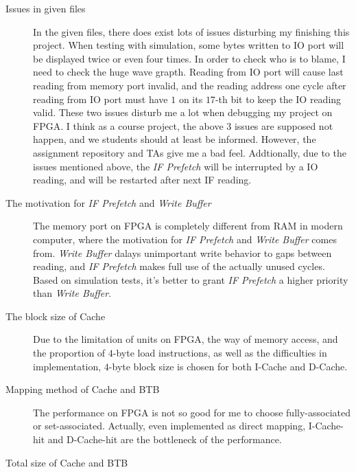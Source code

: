 \documentclass{article}
\begin{document}
        \begin{description}
            \item[Issues in given files]
                In the given files, there does exist lots of issues disturbing my finishing this project.
                When testing with simulation, some bytes written to IO port will be displayed twice or even four times.
                In order to check who is to blame, I need to check the huge wave grapth.
                Reading from IO port will cause last reading from memory port invalid,
                and the reading address one cycle after reading from IO port must have $1$ on its $17$-th bit
                to keep the IO reading valid.
                These two issues disturb me a lot when debugging my project on FPGA.
                I think as a course project, the above $3$ issues are supposed not happen,
                and we students should at least be informed.
                However, the assignment repository and TAs give me a bad feel.
                Addtionally, due to the issues mentioned above,
                the \textit{IF Prefetch} will be interrupted by a IO reading, and will be restarted after next IF reading.
            \item[The motivation for \textit{IF Prefetch} and \textit{Write Buffer}]
                The memory port on FPGA is completely different from RAM in modern computer,
                where the motivation for \textit{IF Prefetch} and \textit{Write Buffer} comes from.
                \textit{Write Buffer} dalays unimportant write behavior to gaps between reading,
                and \textit{IF Prefetch} makes full use of the actually unused cycles.
                Based on simulation tests, it's better to grant \textit{IF Prefetch} a higher priority than \textit{Write Buffer}.
            \item[The block size of Cache]
                Due to the limitation of units on FPGA, the way of memory access,
                and the proportion of $4$-byte load instructions, as well as the difficulties in implementation,
                $4$-byte block size is chosen for both I-Cache and D-Cache.
            \item[Mapping method of Cache and BTB]
                The performance on FPGA is not so good for me to choose
                fully-associated or set-associated. Actually, even implemented as direct mapping,
                I-Cache-hit and D-Cache-hit are the bottleneck of the performance.
            \item[Total size of Cache and BTB]

\end{description}
\end{document}
